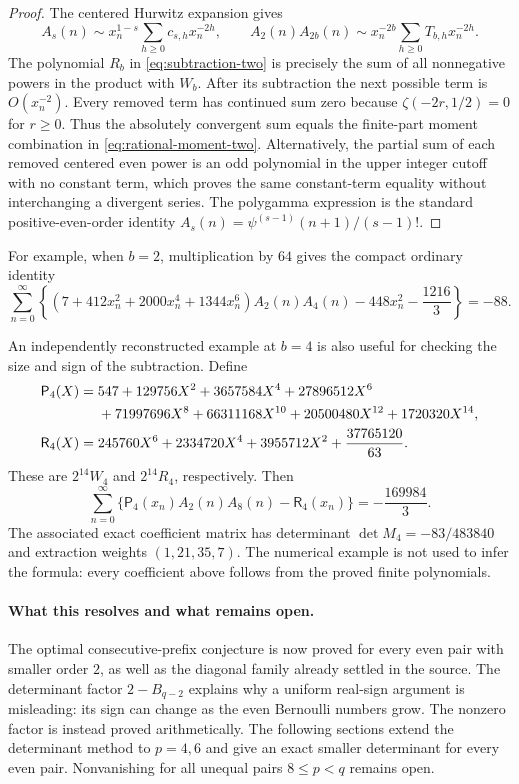 \begin{proof}
The centered Hurwitz expansion gives
\[
 A_s(n)\sim x_n^{1-s}\sum_{h\geq0}c_{s,h}x_n^{-2h},
 \qquad
 A_2(n)A_{2b}(n)\sim
       x_n^{-2b}\sum_{h\geq0}T_{b,h}x_n^{-2h}.
\]
The polynomial $R_b$ in \eqref{eq:subtraction-two} is precisely the
sum of all nonnegative powers in the product with $W_b$.
After its subtraction the next possible term is $O(x_n^{-2})$.
Every removed term has continued sum zero because
$\zeta(-2r,1/2)=0$ for $r\geq0$.  Thus the absolutely convergent
sum equals the finite-part moment combination in
\eqref{eq:rational-moment-two}.  Alternatively, the partial sum of
each removed centered even power is an odd polynomial in the upper
integer cutoff with no constant term, which proves the same
constant-term equality without interchanging a divergent series.
The polygamma expression is the standard positive-even-order
identity $A_s(n)=\psi^{(s-1)}(n+1)/(s-1)!$.
\end{proof}

For example, when $b=2$, multiplication by $64$ gives the compact
ordinary identity
\begin{equation}\label{eq:ordinary-24}
 \sum_{n=0}^{\infty}\left\{
 (7+412x_n^2+2000x_n^4+1344x_n^6)A_2(n)A_4(n)
 -448x_n^2-\frac{1216}{3}
 \right\}=-88.
\end{equation}

An independently reconstructed example at $b=4$ is also useful for
checking the size and sign of the subtraction. Define
\begin{align}
 \mathsf P_4(X)={}&547+129756X^2+3657584X^4+27896512X^6\notag\\
 &+71997696X^8+66311168X^{10}+20500480X^{12}+1720320X^{14},
 \label{eq:P28-example}\\
 \mathsf R_4(X)={}&245760X^6+2334720X^4+3955712X^2
                                    +\frac{37765120}{63}.
 \label{eq:R28-example}
\end{align}
These are $2^{14}W_4$ and $2^{14}R_4$, respectively. Then
\begin{equation}\label{eq:ordinary-28}
 \boxed{\displaystyle
 \sum_{n=0}^{\infty}
    \{\mathsf P_4(x_n)A_2(n)A_8(n)-\mathsf R_4(x_n)\}
       =-\frac{169984}{3}.}
\end{equation}
The associated exact coefficient matrix has determinant
$\det M_4=-83/483840$ and extraction weights $(1,21,35,7)$.
The numerical example is not used to infer the formula: every coefficient
above follows from the proved finite polynomials.

\paragraph{What this resolves and what remains open.}
The optimal consecutive-prefix conjecture is now proved for every
even pair with smaller order $2$, as well as the diagonal family
already settled in the source.  The determinant factor
$2-B_{q-2}$ explains why a uniform real-sign argument is misleading:
its sign can change as the even Bernoulli numbers grow.  The nonzero
factor is instead proved arithmetically.  The following sections extend the determinant method to $p=4,6$ and give
an exact smaller determinant for every even pair. Nonvanishing for all
unequal pairs $8\le p<q$ remains open.
